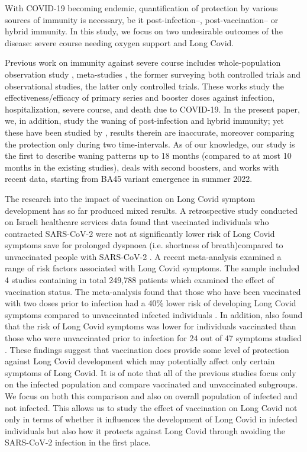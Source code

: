 \documentclass[sn-basic]{sn-jnl}%
\theoremstyle{thmstyleone}%
\theoremstyle{thmstyletwo}%
\theoremstyle{thmstylethree}%
\begin{document}
With COVID-19 becoming endemic, quantification of protection by various sources of immunity is necessary, be it post-infection--, post-vaccination-- or hybrid immunity. In this study, we focus on two undesirable outcomes of the disease: severe course needing oxygen support and Long Covid. 

Previous work on immunity against severe course includes whole-population observation study \citep{smid2022protection}, meta-studies \citep{wu2022long,yang2023efficacy}, the former surveying both controlled trials and observational studies, the latter only controlled trials. These works study the effectiveness/efficacy of primary series and booster doses against infection, hospitalization, severe course, and death due to COVID-19. In the present paper, we, in addition, study the waning of post-infection and hybrid immunity; yet these have been studied by  \citep{smid2022protection}, results therein are inaccurate, moreover comparing the protection only during two time-intervals. As of our knowledge, our study is the first to describe waning patterns up to 18 months (compared to at most 10 months in the existing studies), deals with second boosters, and works with recent data, starting from BA45 variant emergence in summer 2022. 

The research into the impact of vaccination on Long Covid symptom development has so far produced mixed results. A retrospective study conducted on Israeli healthcare services data found that vaccinated individuals who contracted SARS-CoV-2 were not at significantly lower risk of Long Covid symptoms save for prolonged dyspnoea (i.e. shortness of breath)compared to unvaccinated people with SARS-CoV-2 \citep{mizrahi2023long}. A recent meta-analysis \citep{tsampasian2023risk} examined a range of risk factors associated with Long Covid symptoms. The sample included 4 studies containing in total 249,788 patients which examined the effect of vaccination status. The meta-analysis found that those who have been vaccinated with two doses prior to infection had a 40\% lower risk of developing Long Covid symptoms compared to unvaccinated infected individuals \citep{tsampasian2023risk}. In addition, \cite{al2022long} also found that the risk of Long Covid symptoms was lower for individuals vaccinated than those who were unvaccinated prior to infection for 24 out of 47 symptoms studied \citep{al2022long}. These findings suggest that vaccination does provide some level of protection against Long Covid development which may potentially affect only certain symptoms of Long Covid. It is of note that all of the previous studies focus only on the infected population and compare vaccinated and unvaccinated subgroups. We focus on both this comparison and also on overall population of infected and not infected. This allows us to study the effect of vaccination on Long Covid not only in terms of whether it influences the development of Long Covid in infected individuals but also how it protects against Long Covid through avoiding the SARS-CoV-2 infection in the first place.
\end{document}
